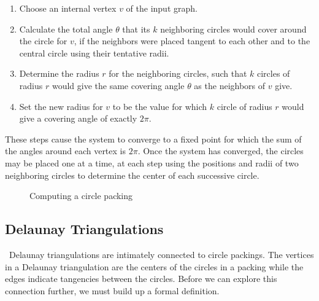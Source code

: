 \documentclass[11pt]{article}
\theoremstyle{definition}
\begin{document}
	\begin{enumerate}
		\item Choose an internal vertex $v$ of the input graph.
		\item Calculate the total angle $\theta$ that its $k$ neighboring circles would cover around the circle for $v$, if the neighbors were placed tangent to each other and to the central circle using their tentative radii.
		\item Determine the radius $r$ for the neighboring circles, such that $k$ circles of radius $r$ would give the same covering angle $\theta$ as the neighbors of $v$ give.
		\item Set the new radius for $v$ to be the value for which $k$ circle of radius $r$ would give a covering angle of exactly $2\pi$.
	\end{enumerate}
	
	These steps cause the system to converge to a fixed point for which the sum of the angles around each vertex is $2\pi$. 
	Once the system has converged, the circles may be placed one at a time, at each step using the positions and radii of two neighboring circles to determine the center of each successive circle.

	\begin{figure}[H]%
    		\centering
    		\qquad
    		\caption{Computing a circle packing}%
    		\label{fig:inout}%
	\end{figure}

\subsection{Delaunay Triangulations}\
	Delaunay triangulations are intimately connected to circle packings. 
	The vertices in a Delaunay triangulation are the centers of the circles in a packing while the edges indicate tangencies between the circles. 
	Before we can explore this connection further, we must build up a formal definition.
	
\end{document}
